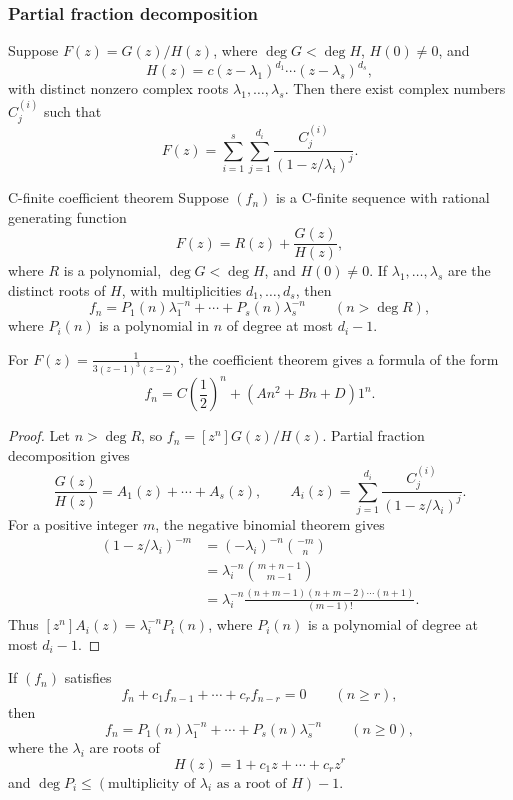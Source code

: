 \subsubsection{Partial fraction decomposition}
Suppose $F(z)=G(z)/H(z)$, where $\deg G<\deg H$, $H(0)\ne0$, and
\[
H(z)=c(z-\lambda_1)^{d_1}\cdots(z-\lambda_s)^{d_s},
\]
with distinct nonzero complex roots $\lambda_1,\ldots,\lambda_s$. Then there exist complex numbers $C_j^{(i)}$ such that
\[
F(z)=\sum_{i=1}^s\sum_{j=1}^{d_i}
\frac{C_j^{(i)}}{(1-z/\lambda_i)^j}.
\]
\begin{theorem}{C-finite coefficient theorem}
Suppose $(f_n)$ is a C-finite sequence with rational generating function
\[
F(z)=R(z)+\frac{G(z)}{H(z)},
\]
where $R$ is a polynomial, $\deg G<\deg H$, and $H(0)\ne0$. If $\lambda_1,\ldots,\lambda_s$ are the distinct roots of $H$, with multiplicities $d_1,\ldots,d_s$, then
\[
f_n=P_1(n)\lambda_1^{-n}+\cdots+P_s(n)\lambda_s^{-n}
\qquad(n>\deg R),
\]
where $P_i(n)$ is a polynomial in $n$ of degree at most $d_i-1$.
\end{theorem}
\begin{example}
For $\displaystyle F(z)=\frac1{3(z-1)^3(z-2)}$, the coefficient theorem gives a formula of the form
\[
f_n=C\left(\frac12\right)^n+(An^2+Bn+D)1^n.
\]
\end{example}
\begin{proof}
Let $n>\deg R$, so $f_n=[z^n]G(z)/H(z)$. Partial fraction decomposition gives
\[
\frac{G(z)}{H(z)}=A_1(z)+\cdots+A_s(z),
\qquad A_i(z)=\sum_{j=1}^{d_i}\frac{C_j^{(i)}}{(1-z/\lambda_i)^j}.
\]
For a positive integer $m$, the negative binomial theorem gives
\begin{align*}
[z^n](1-z/\lambda_i)^{-m}
&=(-\lambda_i)^{-n}\binom{-m}{n}\\
&=\lambda_i^{-n}\binom{m+n-1}{m-1}\\
&=\lambda_i^{-n}\frac{(n+m-1)(n+m-2)\cdots(n+1)}{(m-1)!}.
\end{align*}
Thus $[z^n]A_i(z)=\lambda_i^{-n}P_i(n)$, where $P_i(n)$ is a polynomial of degree at most $d_i-1$.
\end{proof}
\begin{corollary}
If $(f_n)$ satisfies
\[
f_n+c_1f_{n-1}+\cdots+c_rf_{n-r}=0\qquad(n\ge r),
\]
then
\[
f_n=P_1(n)\lambda_1^{-n}+\cdots+P_s(n)\lambda_s^{-n}
\qquad(n\ge0),
\]
where the $\lambda_i$ are roots of
\[
H(z)=1+c_1z+\cdots+c_rz^r
\]
and $\deg P_i\le(\text{multiplicity of $\lambda_i$ as a root of $H$})-1$.
\end{corollary}
